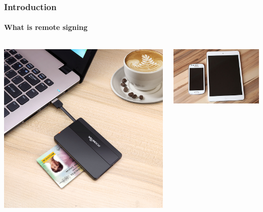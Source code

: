 \begin{frame}[t]\frametitle{Introduction}
 \framesubtitle{What is remote signing}
 \begin{columns}[T]
	\begin{column}{0.5\textwidth}
		\includegraphics[width=\textwidth]{images/cardreader.jpg}
	\end{column}
	\begin{column}{0.5\textwidth}
		\includegraphics[width=\textwidth]{images/tablet-smartphone.jpg}
	\end{column}
 \end{columns}
\end{frame}

